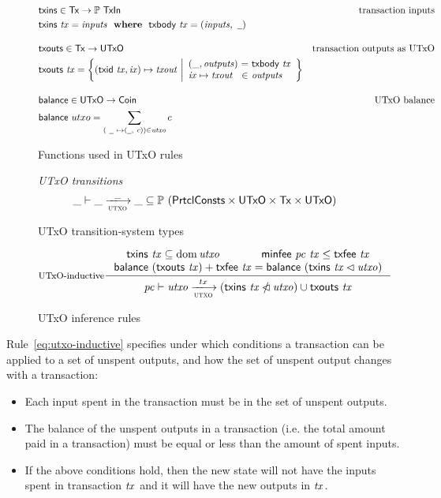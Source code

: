\begin{figure}
  \begin{align*}
    & \fun{txins} \in \Tx \to \powerset{\TxIn}
    & \text{transaction inputs} \\
    & \txins{tx} = \var{inputs} \where \txbody{tx} = (\var{inputs}, ~\wcard)
    \nextdef
    & \fun{txouts} \in \Tx \to \UTxO
    & \text{transaction outputs as UTxO} \\
    & \fun{txouts} ~ \var{tx} =
      \left\{ (\fun{txid} ~ \var{tx}, \var{ix}) \mapsto \var{txout} ~
      \middle| \begin{array}{l@{~}c@{~}l}
                 (\_, \var{outputs}) & = & \txbody{tx} \\
                 \var{ix} \mapsto \var{txout} & \in & \var{outputs}
               \end{array}
      \right\}
    \nextdef
    & \fun{balance} \in \UTxO \to \Coin
    & \text{UTxO balance} \\
    & \fun{balance} ~ utxo = \sum_{(~\wcard ~ \mapsto (\wcard, ~c)) \in \var{utxo}} c
  \end{align*}
  \caption{Functions used in UTxO rules}
  \label{fig:derived-defs:utxo}
\end{figure}

\begin{figure}
  \emph{UTxO transitions}
  \begin{equation*}
    \_ \vdash
    \var{\_} \trans{utxo}{\_} \var{\_}
    \subseteq \powerset (\PrtclConsts \times \UTxO \times \Tx \times \UTxO)
  \end{equation*}
  \caption{UTxO transition-system types}
  \label{fig:ts-types:utxo}
\end{figure}

\begin{figure}
  \begin{equation}\label{eq:utxo-inductive}
    \inference[UTxO-inductive]
    { \txins{tx} \subseteq \dom \var{utxo} & \minfee{pc}{tx} \leq \txfee{tx}\\
      \balance{(\txouts{tx})}  + \txfee{tx} =
        \balance{(\txins{tx} \restrictdom \var{utxo})}
    }
    {\var{pc} \vdash \var{utxo} \trans{utxo}{tx}
      (\txins{tx} \subtractdom \var{utxo}) \cup \txouts{tx}
    }
  \end{equation}
  \caption{UTxO inference rules}
  \label{fig:rules:utxo}
\end{figure}

Rule~\ref{eq:utxo-inductive} specifies under which conditions a transaction can
be applied to a set of unspent outputs, and how the set of unspent output
changes with a transaction:
\begin{itemize}
\item Each input spent in the transaction must be in the set of unspent
  outputs.
\item The balance of the unspent outputs in a transaction (i.e. the total
  amount paid in a transaction) must be equal or less than the amount of spent
  inputs.
\item If the above conditions hold, then the new state will not have the inputs
  spent in transaction $\mathit{tx}$ and it will have the new outputs in
  $\mathit{tx}$.
\end{itemize}

